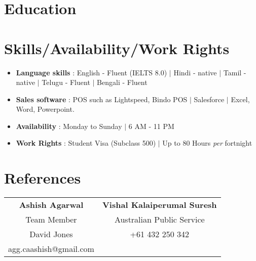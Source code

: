 \documentclass{resume_class_casual}
\begin{document}
\section{Education}
\section{Skills/Availability/Work Rights}
\begin{itemize}[leftmargin = 10pt , labelsep = 3pt , parsep = 0pt , itemsep = 1pt , label =  {\small $\bullet$} ] 
	\item \mdseries \Large { \textbf{Language skills} : English - Fluent (IELTS 8.0) $|$ Hindi - native $|$ Tamil - native $|$ Telugu - Fluent $|$ Bengali - Fluent   }
	\item \mdseries \Large  {\textbf{Sales software} : POS such as Lightspeed, Bindo POS $|$ Salesforce $|$ Excel, Word, Powerpoint. }
	\item \mdseries \Large {\textbf{Availability} : Monday to Sunday $|$ 6 AM - 11 PM}
	\item \mdseries \Large {\textbf{Work Rights} : Student Visa (Subclass 500)  $|$ Up to 80 Hours \textit{per} fortnight}

\end{itemize}

\section{References}
\begin{tabular}{|c|c|} 
	\textbf{Ashish Agarwal}  & \textbf{Vishal Kalaiperumal Suresh} \\
	Team Member & Australian Public Service \\  
	David Jones & +61 432 250 342\\
	agg.caashish@gmail.com
\end{tabular}	
\end{document}
